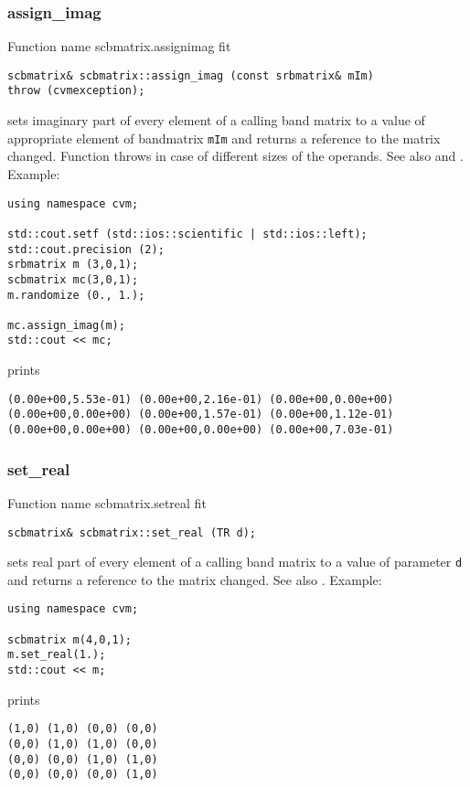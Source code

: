 \subsubsection{assign\_imag}
Function%
\pdfdest name {scbmatrix.assignimag} fit
\begin{verbatim}
scbmatrix& scbmatrix::assign_imag (const srbmatrix& mIm)
throw (cvmexception);
\end{verbatim}
sets imaginary part of every element of a calling band matrix to a value of
appropriate element of  bandmatrix \verb"mIm"
and returns a reference to
the matrix changed.
Function throws  
in case of different sizes of the operands.
See also  and .
Example:
\begin{Verbatim}
using namespace cvm;

std::cout.setf (std::ios::scientific | std::ios::left); 
std::cout.precision (2);
srbmatrix m (3,0,1);
scbmatrix mc(3,0,1);
m.randomize (0., 1.);

mc.assign_imag(m);
std::cout << mc;
\end{Verbatim}
prints
\begin{Verbatim}
(0.00e+00,5.53e-01) (0.00e+00,2.16e-01) (0.00e+00,0.00e+00)
(0.00e+00,0.00e+00) (0.00e+00,1.57e-01) (0.00e+00,1.12e-01)
(0.00e+00,0.00e+00) (0.00e+00,0.00e+00) (0.00e+00,7.03e-01)
\end{Verbatim}
\newpage




\subsubsection{set\_real}
Function%
\pdfdest name {scbmatrix.setreal} fit
\begin{verbatim}
scbmatrix& scbmatrix::set_real (TR d);
\end{verbatim}
sets real part of every element of a calling band matrix to a value of
parameter \verb"d"
and returns a reference to the matrix changed.
See also .
Example:
\begin{Verbatim}
using namespace cvm;

scbmatrix m(4,0,1);
m.set_real(1.);
std::cout << m;
\end{Verbatim}
prints
\begin{Verbatim}
(1,0) (1,0) (0,0) (0,0)
(0,0) (1,0) (1,0) (0,0)
(0,0) (0,0) (1,0) (1,0)
(0,0) (0,0) (0,0) (1,0)
\end{Verbatim}
\newpage





